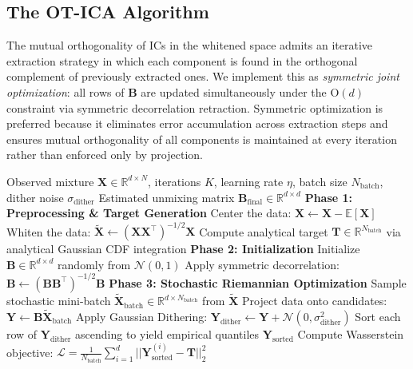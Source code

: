 \documentclass[accepted]{tpm2026} %
\begin{document}
\subsection{The OT-ICA Algorithm}
\label{app:algo}
The mutual orthogonality of ICs in the whitened space admits an iterative extraction strategy in which each component is found in the orthogonal complement of previously extracted ones.
We implement this as \emph{symmetric joint optimization}: all rows of $\mathbf{B}$ are updated simultaneously under the $\mathrm{O}(d)$ constraint via symmetric decorrelation retraction.
Symmetric optimization is preferred because it eliminates error accumulation across extraction steps and ensures mutual orthogonality of all components is maintained at every iteration rather than enforced only by projection.

\begin{algorithm}[htbp]
\caption{The Optimal Transport ICA (OT-ICA) Algorithm}
\label{alg:ot_ica}
\begin{algorithmic}[1]\label{algo:1}
\Require Observed mixture $\mathbf{X} \in \mathbb{R}^{d \times N}$, iterations $K$, learning rate $\eta$, batch size $N_{\text{batch}}$, dither noise $\sigma_{\text{dither}}$
\Ensure Estimated unmixing matrix $\mathbf{B}_{\text{final}} \in \mathbb{R}^{d \times d}$
\State \textbf{Phase 1: Preprocessing \& Target Generation}
\State Center the data: $\mathbf{X} \gets \mathbf{X} - \mathbb{E}[\mathbf{X}]$
\State Whiten the data: $\widetilde{\mathbf{X}} \gets (\mathbf{X}\mathbf{X}^\top)^{-1/2} \mathbf{X}$
\State Compute analytical target $\mathbf{T} \in \mathbb{R}^{N_{\text{batch}}}$ via analytical Gaussian CDF integration
\State \textbf{Phase 2: Initialization}
\State Initialize $\mathbf{B} \in \mathbb{R}^{d \times d}$ randomly from $\mathcal{N}(0,1)$
\State Apply symmetric decorrelation: $\mathbf{B} \gets (\mathbf{B}\mathbf{B}^\top)^{-1/2} \mathbf{B}$
\State \textbf{Phase 3: Stochastic Riemannian Optimization}
    \State Sample stochastic mini-batch $\widetilde{\mathbf{X}}_{\text{batch}} \in \mathbb{R}^{d \times N_{\text{batch}}}$ from $\widetilde{\mathbf{X}}$
    \State Project data onto candidates: $\mathbf{Y} \gets \mathbf{B} \widetilde{\mathbf{X}}_{\text{batch}}$
    \State Apply Gaussian Dithering: $\mathbf{Y}_{\text{dither}} \gets \mathbf{Y} + \mathcal{N}(0, \sigma_{\text{dither}}^2)$
    \State Sort each row of $\mathbf{Y}_{\text{dither}}$ ascending to yield empirical quantiles $\mathbf{Y}_{\text{sorted}}$
    \State Compute Wasserstein objective: $\mathcal{L} = \frac{1}{N_{\text{batch}}} \sum_{i=1}^{d} ||\mathbf{Y}_{\text{sorted}}^{(i)} - \mathbf{T}||_2^2$

\end{algorithmic}
\end{algorithm}
\end{document}
